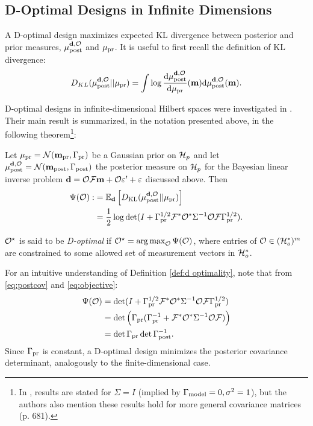 \subsection{D-Optimal Designs in Infinite Dimensions}\label{subsec:D optimal design} 
A D-optimal design maximizes expected KL divergence between posterior
and prior measures, $\mu_{\textup{post}}^{\mathbf{d}, \mathcal{O}}$ and $\mu_{\textup{pr}}$. It is useful to first recall
the definition of KL divergence:%
$$
D_{KL}(\mu_{\textup{post}}^{\mathbf{d}, \mathcal{O}}||\mu_{\textup{pr}}) = \int \log \frac{\text{\textup{d}} \mu_{\textup{post}}^{\mathbf{d}, \mathcal{O}}}{\text{\textup{d}} \mu_{\textup{pr}}}(\mathbf{m}) \text{\textup{d}} \mu_{\textup{post}}^{\mathbf{d}, \mathcal{O}}(\mathbf{m}).
$$

D-optimal designs in infinite-dimensional Hilbert spaces were
investigated in \cite{AlexanderianGloorGhattas14}. Their main result
is summarized, in the notation presented above, in the following
theorem\footnote{In \cite{AlexanderianGloorGhattas14}, results are
stated for $\Sigma=I$ (implied by $\Gamma_{\textup{model}} = 0,\sigma^2=1$), but the
authors also mention these results hold for more general covariance
matrices (p. 681).}:
\begin{theorem}\label{thm:d optimality}
  Let $\mu_{\textup{pr}} = \mathcal{N}(\mathbf{m}_{\textup{pr}},\Gamma_{\textup{pr}})$ be a Gaussian prior on $\mathcal{H}_p$
  and let $\mu_{\textup{post}}^{\mathbf{d}, \mathcal{O}} = \mathcal{N}(\mathbf{m}_{\textup{post}},\Gamma_{\textup{post}})$ the posterior measure
  on $\mathcal{H}_p$ for the Bayesian linear inverse problem $\mathbf{d} = \mathcal{O}
  \mathcal{F}\mathbf{m} + \mathcal{O} \varepsilon' + \varepsilon$ discussed above. Then
  \begin{align}\label{eq:objective}
    \begin{split}
      \tar( \obs) :&= \mathbb{E}_{\data}\left [ D_{\text{KL}} (\post || \pr ) \right ] \\
      &= \frac12 \log \det 
      ( I + \prcov^{1/2}  \fwd ^* \obs^* \Sigma^{-1} \obs \fwd \prcov^{1/2}).
    \end{split}
  \end{align}
\end{theorem}
\begin{definition}\label{def:d optimality}
  $\mathcal{O}^{\star}$ is said to be \emph{D-optimal} if $\mathcal{O}^{\star} =
  \operatorname*{arg\,max}_{\mathcal{O}} \Psi(\mathcal{O})$, where entries of $\mathcal{O} \in (\mathcal{H}_o^*)^m$ are constrained to
  some allowed set of measurement vectors in $\mathcal{H}_o^*$.
\end{definition}

\noindent For an intuitive understanding of Definition \ref{def:d
  optimality}, note that from \eqref{eq:postcov} and
\eqref{eq:objective}:
\begin{align*}
  \begin{split}
    \tar(\obs) &= \det ( I + \prcov^{1/2}  \fwd ^* \obs^* \Sigma^{-1} \obs \fwd \prcov^{1/2}) \\
    &= \det \Big( \prcov ( \prcov^{-1} + \fwd ^* \obs^* \Sigma^{-1} \obs \fwd) \Big )\\
    &= \det \prcov \det \postcov^{-1}.
  \end{split}
\end{align*}
Since $\Gamma_{\textup{pr}}$ is constant, a D-optimal design minimizes the posterior
covariance determinant, analogously to the finite-dimensional case.



